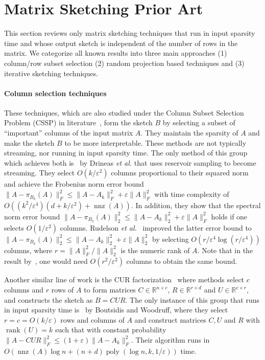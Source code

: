 \documentclass[11pt]{article}
\newcommand{\R}{\mathbb{R}}
\newcommand{\rank}{\operatorname{rank}}
\newcommand{\nnz}{\operatorname{nnz}}
\newcommand{\poly}{\operatorname{poly}}
\newcommand{\eps}{\varepsilon}
\newcommand{\etal}{\emph{et al.}\xspace}
\newcommand{\Paragraph}[1]{\paragraph*{\sffamily \textbf{#1}}}
\begin{document}
\section{Matrix Sketching Prior Art}
This section reviews only matrix sketching techniques that run in input sparsity time and whose output sketch is independent of the number of rows in the matrix.  We categorize all known results into three main approaches (1) column/row subset selection (2) random projection based techniques and (3) iterative sketching techniques. 



\Paragraph{Column selection techniques} 
These techniques, which are also studied under the Column Subset Selection Problem (CSSP) in literature~\cite{frieze2004fast,drineas2003pass,boutsidis2009improved,deshpande2006adaptive,drineas2011faster,boutsidis2011near}, form the sketch $B$ by selecting a subset of ``important'' columns of the input matrix $A$. They maintain the sparsity of $A$ and make the sketch $B$ to be more interpretable. These methods are not typically streaming, nor running in input sparsity time. The only method of this group which achieves both is~\cite{drineas2006fast2} by Drineas \etal that uses reservoir sampling to become streaming. 
They select $O(k/\eps^2)$ columns proportional to their squared norm and achieve the Frobenius norm error bound $\|A-\pi_{B_k}(A)\|_F^2 \leq \|A-A_k\|_F^2 + \eps \|A\|_F^2$ with time complexity of $O((k^2/\eps^4) (d+k/\eps^2) + \nnz(A))$.  
In addition, they show that the spectral norm error bound $\|A-\pi_{B_k}(A)\|_2^2 \leq \|A-A_k\|_2^2 + \eps \|A\|_F^2$ holds if one selects $O(1/\eps^2)$ columns. Rudelson \etal~\cite{rudelson2007sampling} improved the latter error bound to $\|A-\pi_{B_k}(A)\|_2^2 \leq \|A-A_k\|_2^2 + \eps \|A\|_2^2$ by selecting $O(r/\eps^4 \log{(r/\eps^4)})$ columns, where $r = \|A\|_F^2 / \|A\|_2^2$ is the numeric rank of $A$. Note that in the result by~\cite{drineas2006fast2}, one would need $O(r^2/\eps^2)$ columns to obtain the same bound.

Another similar line of work is the CUR factorization~\cite{boutsidis2014optimal,drineas2003pass,drineas2006fast,drineas2008relative,mahoney2009cur} where methods select $c$ columns and $r$ rows of $A$ to form matrices $C\in\R^{n\times c}$, $R\in\R^{r\times d}$ and $U\in\R^{c\times r}$, and constructs the sketch as $B = CUR$. The only instance of this group that runs in input sparsity time is~\cite{boutsidis2014optimal} by Boutsidis and Woodruff, where they select $r = c = O(k/\eps)$ rows and columns of $A$ and construct matrices $C, U$ and $R$ with $\rank(U) = k$ such that with constant probability $\|A-CUR\|_F^2 \leq (1+\eps)\|A-A_k\|_F^2$. Their algorithm runs in $O(\nnz(A) \log n + (n+d) \poly(\log n, k, 1/\eps))$ time.
\end{document}
